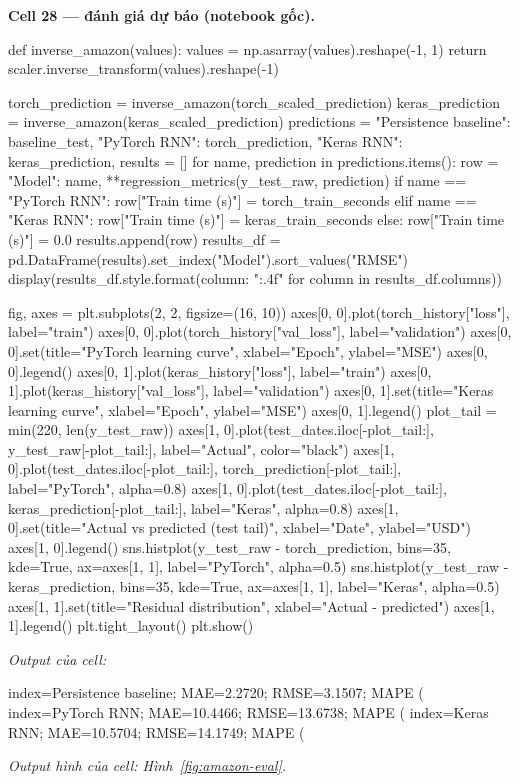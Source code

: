 \documentclass[12pt,a4paper]{report}
\begin{document}
\par\medskip\noindent\textbf{Cell 28 --- đánh giá dự báo (notebook gốc).}
\begin{NotebookCode}
def inverse_amazon(values):
    values = np.asarray(values).reshape(-1, 1)
    return scaler.inverse_transform(values).reshape(-1)

torch_prediction = inverse_amazon(torch_scaled_prediction)
keras_prediction = inverse_amazon(keras_scaled_prediction)
predictions = {
    "Persistence baseline": baseline_test,
    "PyTorch RNN": torch_prediction,
    "Keras RNN": keras_prediction,
}
results = []
for name, prediction in predictions.items():
    row = {"Model": name, **regression_metrics(y_test_raw, prediction)}
    if name == "PyTorch RNN":
        row["Train time (s)"] = torch_train_seconds
    elif name == "Keras RNN":
        row["Train time (s)"] = keras_train_seconds
    else:
        row["Train time (s)"] = 0.0
    results.append(row)
results_df = pd.DataFrame(results).set_index("Model").sort_values("RMSE")
display(results_df.style.format({column: "{:.4f}" for column in results_df.columns}))

fig, axes = plt.subplots(2, 2, figsize=(16, 10))
axes[0, 0].plot(torch_history["loss"], label="train")
axes[0, 0].plot(torch_history["val_loss"], label="validation")
axes[0, 0].set(title="PyTorch learning curve", xlabel="Epoch", ylabel="MSE")
axes[0, 0].legend()
axes[0, 1].plot(keras_history["loss"], label="train")
axes[0, 1].plot(keras_history["val_loss"], label="validation")
axes[0, 1].set(title="Keras learning curve", xlabel="Epoch", ylabel="MSE")
axes[0, 1].legend()
plot_tail = min(220, len(y_test_raw))
axes[1, 0].plot(test_dates.iloc[-plot_tail:], y_test_raw[-plot_tail:], label="Actual", color="black")
axes[1, 0].plot(test_dates.iloc[-plot_tail:], torch_prediction[-plot_tail:], label="PyTorch", alpha=0.8)
axes[1, 0].plot(test_dates.iloc[-plot_tail:], keras_prediction[-plot_tail:], label="Keras", alpha=0.8)
axes[1, 0].set(title="Actual vs predicted (test tail)", xlabel="Date", ylabel="USD")
axes[1, 0].legend()
sns.histplot(y_test_raw - torch_prediction, bins=35, kde=True, ax=axes[1, 1], label="PyTorch", alpha=0.5)
sns.histplot(y_test_raw - keras_prediction, bins=35, kde=True, ax=axes[1, 1], label="Keras", alpha=0.5)
axes[1, 1].set(title="Residual distribution", xlabel="Actual - predicted")
axes[1, 1].legend()
plt.tight_layout()
plt.show()
\end{NotebookCode}
\noindent\textit{Output của cell:}
\begin{NotebookOutput}
index=Persistence baseline; MAE=2.2720; RMSE=3.1507; MAPE (%
index=PyTorch RNN; MAE=10.4466; RMSE=13.6738; MAPE (%
index=Keras RNN; MAE=10.5704; RMSE=14.1749; MAPE (%
\end{NotebookOutput}
\noindent\textit{Output hình của cell: Hình~\ref{fig:amazon-eval}.}
\end{document}
